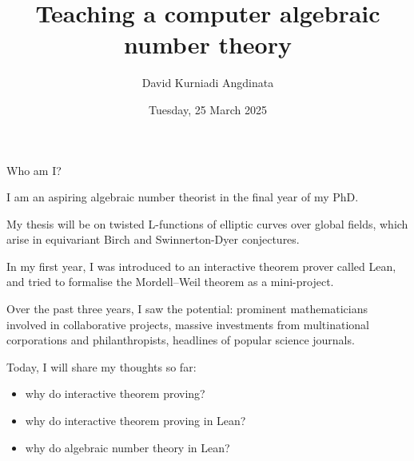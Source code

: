 \documentclass[10pt]{beamer}
\title{Teaching a computer algebraic number theory}
\author{David Kurniadi Angdinata}
\institute{London School of Geometry and Number Theory}
\date{Tuesday, 25 March 2025}
\begin{document}
\frame{\titlepage}

\begin{frame}[t]{Who am I?}

I am an aspiring algebraic number theorist in the final year of my PhD.

\pause

\vspace{0.5cm} My thesis will be on twisted L-functions of elliptic curves over global fields, which arise in equivariant Birch and Swinnerton-Dyer conjectures.

\pause

\vspace{0.5cm} In my first year, I was introduced to an interactive theorem prover called Lean, and tried to formalise the Mordell--Weil theorem as a mini-project.

\pause

\vspace{0.5cm} Over the past three years, I saw the potential: prominent mathematicians involved in collaborative projects, massive investments from multinational corporations and philanthropists, headlines of popular science journals.

\pause

\vspace{0.5cm} Today, I will share my thoughts so far:
\begin{itemize}
\item why do interactive theorem proving?
\item why do interactive theorem proving in Lean?
\item why do algebraic number theory in Lean?
\end{itemize}

\end{frame}
\end{document}
